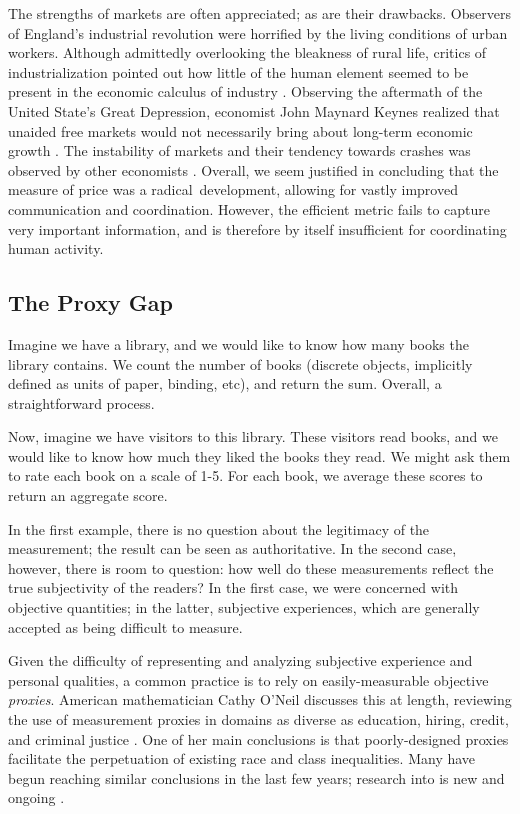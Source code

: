 \documentclass[12pt]{book}
\begin{document}
\bigskip

The strengths of markets are often appreciated; as are their drawbacks.
Observers of England's industrial revolution were horrified by the living conditions of urban workers.
Although admittedly overlooking the bleakness of rural life, critics of industrialization pointed out how little of the human element seemed to be present in the economic calculus of industry \cite{heilbroner}.
Observing the aftermath of the United State's Great Depression, economist John Maynard Keynes realized that unaided free markets would not necessarily bring about long-term economic growth \cite{heilbroner}.
The instability of markets and their tendency towards crashes was observed by other economists \cite{minsky}.
Overall, we seem justified in concluding that the measure of price was a radical development, allowing for vastly improved communication and coordination.
However, the efficient metric fails to capture very important information, and is therefore by itself insufficient for coordinating human activity.


\subsection{The Proxy Gap}

Imagine we have a library, and we would like to know how many books the library contains. We count the number of books (discrete objects, implicitly defined as units of paper, binding, etc), and return the sum. Overall, a straightforward process.

Now, imagine we have visitors to this library. These visitors read books, and we would like to know how much they liked the books they read. We might ask them to rate each book on a scale of 1-5. For each book, we average these scores to return an aggregate score.

In the first example, there is no question about the legitimacy of the measurement; the result can be seen as authoritative. In the second case, however, there is room to question: how well do these measurements reflect the true subjectivity of the readers? In the first case, we were concerned with objective quantities; in the latter, subjective experiences, which are generally accepted as being difficult to measure.

\bigskip

Given the difficulty of representing and analyzing subjective experience and personal qualities, a common practice is to rely on easily-measurable objective \textit{proxies}.
American mathematician Cathy O'Neil discusses this at length, reviewing the use of measurement proxies in domains as diverse as education, hiring, credit, and criminal justice \cite{oneil}.
One of her main conclusions is that poorly-designed proxies facilitate the perpetuation of existing race and class inequalities.
Many have begun reaching similar conclusions in the last few years; research into  is new and ongoing \cite{tramer} \cite{friedler}.
\end{document}
